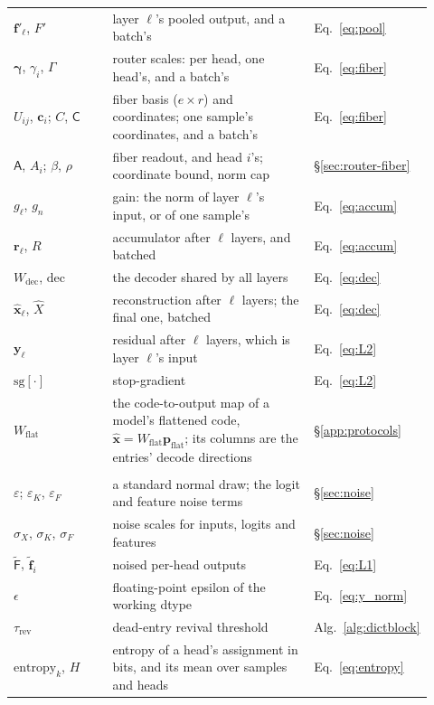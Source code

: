 \begin{longtable}{@{}>{\raggedright\arraybackslash}p{0.25\linewidth}%
>{\raggedright\arraybackslash}p{0.52\linewidth}%
>{\raggedright\arraybackslash}p{0.15\linewidth}@{}}
$\mathbf{f}'_\ell$, $F'$ & layer $\ell$'s pooled output, and a batch's & Eq.~\eqref{eq:pool} \\
$\boldsymbol{\gamma}$, $\gamma_i$, $\Gamma$ & router scales: per head, one head's, and a batch's & Eq.~\eqref{eq:fiber} \\
$U_{ij}$, $\mathbf{c}_i$; $C$, $\mathsf{C}$ & fiber basis ($e\times r$) and coordinates; one sample's coordinates, and a batch's & Eq.~\eqref{eq:fiber} \\
$\mathsf{A}$, $A_i$; $\beta$, $\rho$ & fiber readout, and head $i$'s; coordinate bound, norm cap & §\ref{sec:router-fiber} \\
$g_\ell$, $g_n$ & gain: the norm of layer $\ell$'s input, or of one sample's & Eq.~\eqref{eq:accum} \\
$\mathbf{r}_\ell$, $R$ & accumulator after $\ell$ layers, and batched & Eq.~\eqref{eq:accum} \\
$W_{\mathrm{dec}}$, $\mathrm{dec}$ & the decoder shared by all layers & Eq.~\eqref{eq:dec} \\
$\hat{\mathbf{x}}_\ell$, $\hat{X}$ & reconstruction after $\ell$ layers; the final one, batched & Eq.~\eqref{eq:dec} \\
$\mathbf{y}_\ell$ & residual after $\ell$ layers, which is layer $\ell$'s input & Eq.~\eqref{eq:L2} \\
$\mathrm{sg}[\cdot]$ & stop-gradient & Eq.~\eqref{eq:L2} \\
$W_{\mathrm{flat}}$ & the code-to-output map of a model's flattened code, $\hat{\mathbf{x}} = W_{\mathrm{flat}}\mathbf{p}_{\mathrm{flat}}$; its columns are the entries' decode directions & §\ref{app:protocols} \\
\addlinespace
\multicolumn{3}{@{}l}{\emph{Noise, statistics and loss}} \\[2pt]
$\varepsilon$; $\varepsilon_K$, $\varepsilon_F$ & a standard normal draw; the logit and feature noise terms & §\ref{sec:noise} \\
$\sigma_X$, $\sigma_K$, $\sigma_F$ & noise scales for inputs, logits and features & §\ref{sec:noise} \\
$\tilde{\mathsf{F}}$, $\tilde{\mathbf{f}}_i$ & noised per-head outputs & Eq.~\eqref{eq:L1} \\
$\epsilon$ & floating-point epsilon of the working dtype & Eq.~\eqref{eq:y_norm} \\
$\tau_{\mathrm{rev}}$ & dead-entry revival threshold & Alg.~\ref{alg:dictblock} \\
$\mathrm{entropy}_k$, $H$ & entropy of a head's assignment in bits, and its mean over samples and heads & Eq.~\eqref{eq:entropy} \\

\end{longtable}
